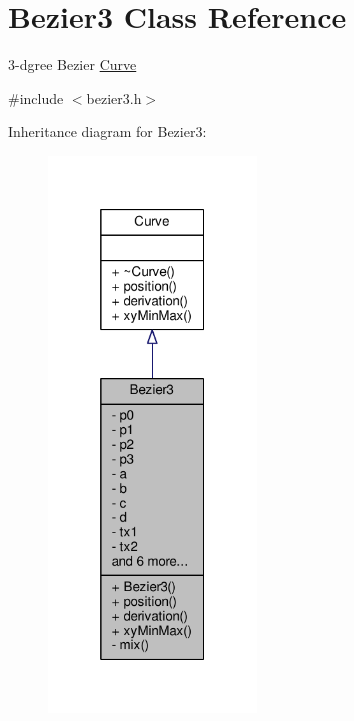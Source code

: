 \hypertarget{classBezier3}{}\section{Bezier3 Class Reference}
\label{classBezier3}


3-\/dgree Bezier \hyperlink{classCurve}{Curve}  




{\ttfamily \#include $<$bezier3.\+h$>$}



Inheritance diagram for Bezier3\+:
\nopagebreak
\begin{figure}[H]
\begin{center}
\leavevmode
\includegraphics[width=157pt]{classBezier3__inherit__graph}
\end{center}
\end{figure}



